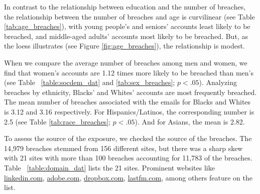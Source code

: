 \documentclass[sigconf]{acmart}
\begin{document}
In contrast to the relationship between education and the number of breaches, the relationship between the number of breaches and age is curvilinear (see Table \ref{tab:age_breaches}), with young people's and seniors' accounts least likely to be breached, and middle-aged adults' accounts most likely to be breached. But, as the loess illustrates (see Figure \ref{fig:age_breaches}), the relationship is modest.



When we compare the average number of breaches among men and women, we find that women's accounts are 1.12 times more likely to be breached than men's (see Table ~\ref{table:socdem_dat} and \ref{tab:sex_breaches}; $p < .05$). Analyzing breaches by ethnicity, Blacks' and Whites' accounts are most frequently breached. The mean number of breaches associated with the emails for Blacks and Whites is 3.12 and 3.16 respectively. For Hispanics/Latinos, the corresponding number is 2.5 (see Table \ref{tab:race_breaches}; $p < .05$). And for Asians, the mean is 2.82.

To assess the source of the exposure, we checked the source of the breaches. The 14,979 breaches stemmed from 156 different sites, but there was a sharp skew with 21 sites with more than 100 breaches accounting for 11,783 of the breaches. Table ~\ref{table:domain_dat} lists the 21 sites. Prominent websites like \url{linkedin.com}, \url{adobe.com}, \url{dropbox.com}, \url{lastfm.com}, among others feature on the list.
\end{document}
